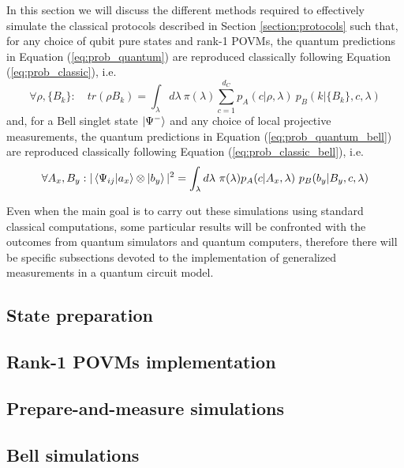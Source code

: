 In this section we will discuss the different methods required to effectively simulate the classical protocols described in Section \ref{section:protocols} such that, for any choice of qubit pure states and rank-1 POVMs, the quantum predictions in Equation (\ref{eq:prob_quantum}) are reproduced classically following Equation (\ref{eq:prob_classic}), i.e.
\begin{equation}
\forall \rho, \{B_{k}\}:\quad tr(\rho B_{k}) = \int_{\lambda} d\lambda\ \pi(\lambda) \sum_{c=1}^{d_C} p_A(c|\rho, \lambda)\ p_B(k|\{B_{k}\}, c, \lambda)    
\end{equation}
and, for a Bell singlet state $\ket{\Psi^{-}}$ and any choice of local projective measurements, the quantum predictions in Equation (\ref{eq:prob_quantum_bell}) are reproduced classically following Equation (\ref{eq:prob_classic_bell}), i.e.
\begin{equation}
\forall A_{x}, B_{y}: |\bra{\Psi_{ij}}\ket{a_{x}} \otimes \ket{b_{y}}|^{2} = \int_{\lambda} d\lambda\ \pi(\lambda) p_A(c|A_{x}, \lambda)\ p_B(b_{y}|B_{y}, c, \lambda)
\end{equation}

Even when the main goal is to carry out these simulations using standard classical computations, some particular results will be confronted with the outcomes from quantum simulators and quantum computers, therefore there will be specific subsections devoted to the implementation of generalized measurements in a quantum circuit model. 
\subsection{State preparation}

\subsection{Rank-1 POVMs implementation}

\subsection{Prepare-and-measure simulations}

\subsection{Bell simulations}\label{section:methods_bell}
